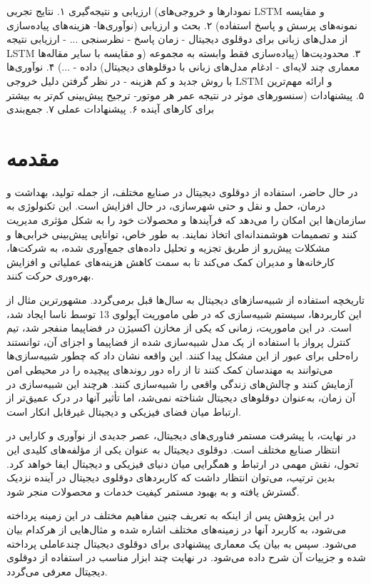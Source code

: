 ارزیابی و نتیجه‌گیری
۱. نتایج تجربی (نمودار‌ها و خروجی‌های LSTM و مقایسه نو‌آوری‌ها- هزینه‌های پیاده‌سازی)
۲. بحث و ارزیابی (نمونه‌های پرسش و پاسخ استفاده از مدل‌های زبانی برای دوقلوی دیجیتال - زمان پاسخ - نظرسنجی ... - ارزیابی نتیجه LSTM و مقایسه با سایر مقاله‌‌ها)
۳. محدودیت‌ها (پیاده‌سازی فقط وابسته به مجموعه داده - ...)
۴. نوآوری‌ها (معماری چند لایه‌ای - ادغام مدل‌های زبانی با دوقلو‌های دیجیتال با روش جدید و کم هزینه - در نظر گرفتن دلیل خروجی LSTM و ارائه مهم‌ترین سنسور‌های موثر در نتیجه عمر هر موتور- ترجیح پیش‌بینی کم‌تر به بیشتر)
۵. پیشنهادات برای کار‌های آینده
۶. پیشنهادات عملی
۷. جمع‌بندی


\section{مقدمه}

در حال حاضر، استفاده از دوقلوی دیجیتال در صنایع مختلف، از جمله تولید، بهداشت و درمان، حمل و نقل و حتی شهرسازی، در حال افزایش است. این تکنولوژی به سازمان‌ها این امکان را می‌دهد که فرآیندها و محصولات خود را به شکل مؤثری مدیریت کنند و تصمیمات هوشمندانه‌ای اتخاذ نمایند. به طور خاص، توانایی پیش‌بینی خرابی‌ها و مشکلات پیش‌رو از طریق تجزیه و تحلیل داده‌های جمع‌آوری شده، به شرکت‌ها، کارخانه‌ها و مدیران کمک می‌کند تا به سمت کاهش هزینه‌های عملیاتی و افزایش بهره‌وری حرکت کنند.


تاریخچه استفاده از شبیه‌ساز‌های دیجیتال به سال‌ها قبل برمی‌گردد. مشهورترین مثال از این کاربردها، سیستم شبیه‌سازی که در طی ماموریت آپولوی 13 توسط ناسا ایجاد شد، است. در این ماموریت، زمانی که یکی از مخازن اکسیژن در فضاپیما منفجر شد، تیم کنترل پرواز با استفاده از یک مدل شبیه‌سازی شده از فضاپیما و اجزای آن، توانستند راه‌حلی برای عبور از این مشکل پیدا کنند. این واقعه نشان داد که چطور شبیه‌سازی‌ها می‌توانند به مهندسان کمک کنند تا از راه دور روندهای پیچیده را در محیطی امن آزمایش کنند و چالش‌های زندگی واقعی را شبیه‌سازی کنند. هرچند این شبیه‌سازی در آن زمان، به‌عنوان دوقلوهای دیجیتال شناخته نمی‌شد، اما تأثیر آنها در درک عمیق‌تر از ارتباط میان فضای فیزیکی و دیجیتال غیرقابل انکار است.
\cite{b3}

در نهایت، با پیشرفت مستمر فناوری‌های دیجیتال، عصر جدیدی از نوآوری و کارایی در انتظار صنایع مختلف است. دوقلوی دیجیتال به عنوان یکی از مؤلفه‌های کلیدی این تحول، نقش مهمی در ارتباط و همگرایی میان دنیای فیزیکی و دیجیتال ایفا خواهد کرد. بدین ترتیب، می‌توان انتظار داشت که کاربردهای دوقلوی دیجیتال در آینده نزدیک گسترش یافته و به بهبود مستمر کیفیت خدمات و محصولات منجر شود.

در این پژوهش پس از اینکه به تعریف چنین مفاهیم مختلف در این زمینه پرداخته می‌شود، به کاربرد آنها در زمینه‌های مختلف اشاره شده و مثال‌هایی از هرکدام بیان می‌شود. سپس به بیان یک معماری پیشنهادی برای دوقلوی دیجیتال چندعاملی پرداخته شده و جزییات آن شرح داده می‌شود. در نهایت چند ابزار مناسب در استفاده از دوقلوی دیجیتال معرفی می‌گردد.




